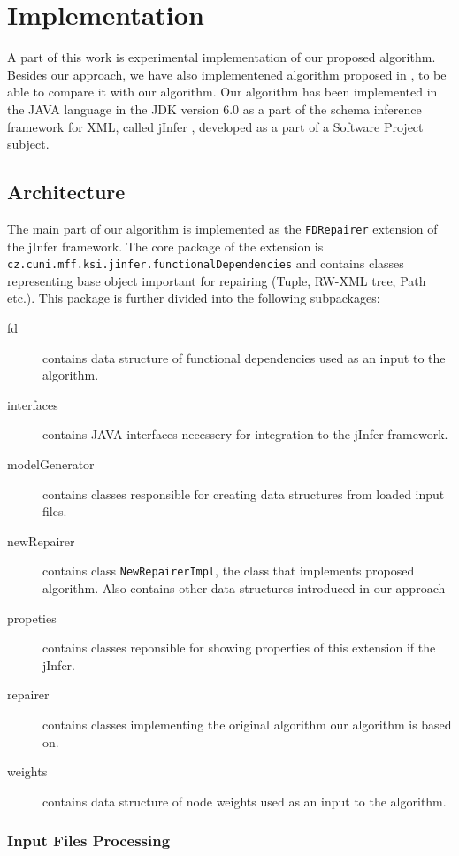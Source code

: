 \chapter{Implementation}

A part of this work is experimental implementation of our proposed algorithm. Besides our approach, we have also implementened algorithm proposed in \cite{RepAndConsistentAnswer}, to be able to compare it with our algorithm. Our algorithm has been implemented in the JAVA language in the JDK version 6.0 as a part of the schema inference framework for XML, called jInfer \cite{jinfer}, developed as a part of a Software Project subject.

\section{Architecture}

The main part of our algorithm is implemented as the \texttt{FDRepairer} extension of the jInfer framework. The core package of the extension is \texttt{cz.cuni.mff.\discretionary{}{}{}ksi.jinfer.functionalDependencies} and contains classes representing base object important for repairing (Tuple, RW-XML tree, Path etc.). This package is further divided into the following subpackages:

\begin{description}
	\item[fd] contains data structure of functional dependencies used as an input to the algorithm.
    \item [interfaces] contains JAVA interfaces necessery for integration to the jInfer framework.
    \item [modelGenerator] contains classes responsible for creating data structures from loaded input files.
    \item [newRepairer] contains class \texttt{NewRepairerImpl}, the class that implements proposed algorithm. Also contains other data structures introduced in our approach
    \item [propeties] contains classes reponsible for showing properties of this extension if the jInfer.
    \item [repairer] contains classes implementing the original algorithm our algorithm is based on.
    \item [weights] contains data structure of node weights used as an input to the algorithm.
\end{description}

\subsection{Input Files Processing}

